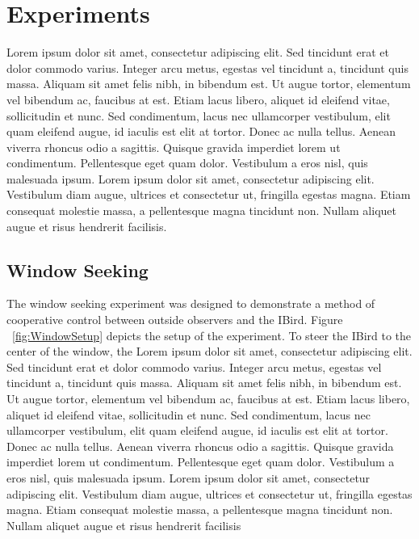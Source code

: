 \documentclass[letterpaper, 10 pt, conference]{ieeeconf}
\begin{document}
\section{Experiments}
Lorem ipsum dolor sit amet, consectetur adipiscing elit. Sed tincidunt erat et dolor commodo varius. Integer arcu metus, egestas vel tincidunt a, tincidunt quis massa. Aliquam sit amet felis nibh, in bibendum est. Ut augue tortor, elementum vel bibendum ac, faucibus at est. Etiam lacus libero, aliquet id eleifend vitae, sollicitudin et nunc. Sed condimentum, lacus nec ullamcorper vestibulum, elit quam eleifend augue, id iaculis est elit at tortor. Donec ac nulla tellus. Aenean viverra rhoncus odio a sagittis. Quisque gravida imperdiet lorem ut condimentum. Pellentesque eget quam dolor. Vestibulum a eros nisl, quis malesuada ipsum. Lorem ipsum dolor sit amet, consectetur adipiscing elit. Vestibulum diam augue, ultrices et consectetur ut, fringilla egestas magna. Etiam consequat molestie massa, a pellentesque magna tincidunt non. Nullam aliquet augue et risus hendrerit facilisis.

\subsection{Window Seeking}
The window seeking experiment was designed to demonstrate a method of cooperative control between outside observers and the IBird. Figure ~\ref{fig:WindowSetup} depicts the setup of the experiment. To steer the IBird to the center of the window, the 
Lorem ipsum dolor sit amet, consectetur adipiscing elit. Sed tincidunt erat et dolor commodo varius. Integer arcu metus, egestas vel tincidunt a, tincidunt quis massa. Aliquam sit amet felis nibh, in bibendum est. Ut augue tortor, elementum vel bibendum ac, faucibus at est. Etiam lacus libero, aliquet id eleifend vitae, sollicitudin et nunc. Sed condimentum, lacus nec ullamcorper vestibulum, elit quam eleifend augue, id iaculis est elit at tortor. Donec ac nulla tellus. Aenean viverra rhoncus odio a sagittis. Quisque gravida imperdiet lorem ut condimentum. Pellentesque eget quam dolor. Vestibulum a eros nisl, quis malesuada ipsum. Lorem ipsum dolor sit amet, consectetur adipiscing elit. Vestibulum diam augue, ultrices et consectetur ut, fringilla egestas magna. Etiam consequat molestie massa, a pellentesque magna tincidunt non. Nullam aliquet augue et risus hendrerit facilisis

\end{document}
